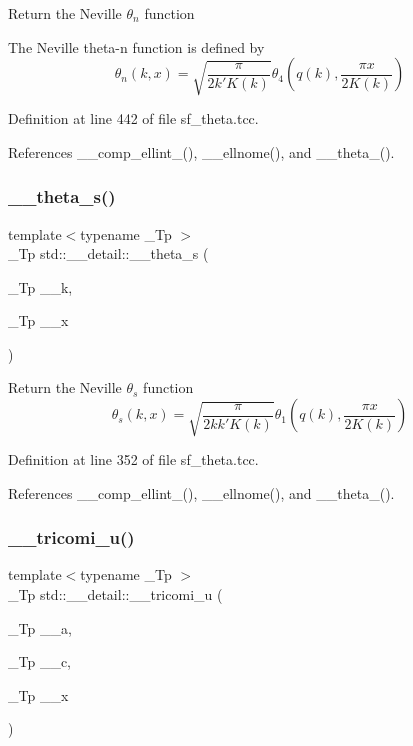 Return the Neville $ \theta_n $ function

The Neville theta-\/n function is defined by \[ \theta_n(k,x) = \sqrt{\frac{\pi}{2k'K(k)}} \theta_4\left(q(k),\frac{\pi x}{2K(k)}\right) \] 

Definition at line 442 of file sf\+\_\+theta.\+tcc.



References \+\_\+\+\_\+comp\+\_\+ellint\+\_(), \+\_\+\+\_\+ellnome(), and \+\_\+\+\_\+theta\+\_().

\mbox{\label{namespacestd_1_1____detail_aeac5da2d394fafe6432871abf5c05413}} 
\subsubsection{\texorpdfstring{\+\_\+\+\_\+theta\+\_\+s()}{\_\_theta\_s()}}
{\footnotesize\ttfamily template$<$typename \+\_\+\+Tp $>$ \\
\+\_\+\+Tp std\+::\+\_\+\+\_\+detail\+::\+\_\+\+\_\+theta\+\_\+s (\begin{DoxyParamCaption}\item[{\+\_\+\+Tp}]{\+\_\+\+\_\+k,  }\item[{\+\_\+\+Tp}]{\+\_\+\+\_\+x }\end{DoxyParamCaption})}

Return the Neville $ \theta_s $ function \[ \theta_s(k,x) = \sqrt{\frac{\pi}{2 k k' K(k)}} \theta_1\left(q(k),\frac{\pi x}{2K(k)}\right) \] 

Definition at line 352 of file sf\+\_\+theta.\+tcc.



References \+\_\+\+\_\+comp\+\_\+ellint\+\_(), \+\_\+\+\_\+ellnome(), and \+\_\+\+\_\+theta\+\_().

\mbox{\label{namespacestd_1_1____detail_ae67133e463041158ebbffe6c54af6e0a}} 
\subsubsection{\texorpdfstring{\+\_\+\+\_\+tricomi\+\_\+u()}{\_\_tricomi\_u()}}
{\footnotesize\ttfamily template$<$typename \+\_\+\+Tp $>$ \\
\+\_\+\+Tp std\+::\+\_\+\+\_\+detail\+::\+\_\+\+\_\+tricomi\+\_\+u (\begin{DoxyParamCaption}\item[{\+\_\+\+Tp}]{\+\_\+\+\_\+a,  }\item[{\+\_\+\+Tp}]{\+\_\+\+\_\+c,  }\item[{\+\_\+\+Tp}]{\+\_\+\+\_\+x }\end{DoxyParamCaption})}



